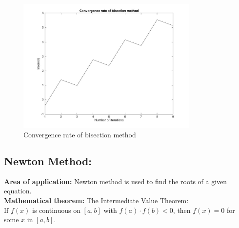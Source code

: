 \documentclass{article}
\begin{document}
	\begin{figure}[H]
		\caption{Convergence rate of bisection method}
		\includegraphics[width=0.8\textwidth, height=0.6\textwidth]{bisection_errorplot.jpg}
	\end{figure}
	\subsection{Newton Method:}
	
	{\bf Area of application:} Newton method is used to find the roots of a given equation.\\
	
	{\bf Mathematical theorem:} The Intermediate Value Theorem: \\[0.1in]
	If $f(x)$ is continuous on $[a,b]$ with $f(a)\cdot f(b)<0$, then $f(x) = 0$ for some $x$ in $[a,b]$.\\
	
\end{document}
